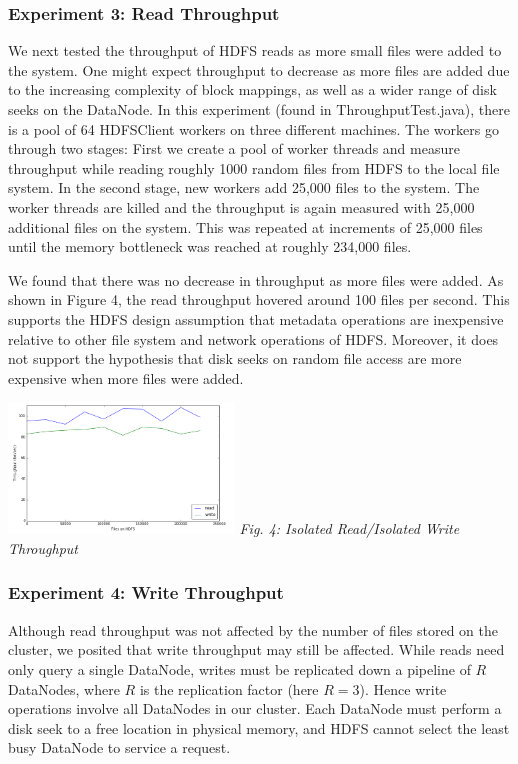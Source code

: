 \documentclass[11pt, a4paper]{article}
\begin{document}
\begin{multicols*}{2}
\subsubsection{Experiment 3: Read Throughput}\label{ReadThroughput}
We next tested the throughput of HDFS reads as more small files were added to the system. One might expect throughput to decrease as more files are added due to the increasing complexity of block mappings, as well as a wider range of disk seeks on the DataNode. In this experiment (found in ThroughputTest.java), there is a pool of 64 HDFSClient workers on three different machines. The workers go through two stages: First we create a pool of worker threads and measure throughput while reading roughly 1000 random files from HDFS to the local file system. In the second stage, new workers add 25,000 files to the system. The worker threads are killed and the throughput is again measured with 25,000 additional files on the system. This was repeated at increments of 25,000 files until the memory bottleneck was reached at roughly 234,000 files.

We found that there was no decrease in throughput as more files were added. As shown in Figure 4, the read throughput hovered around 100 files per second. This supports the HDFS design assumption that metadata operations are inexpensive relative to other file system and network operations of HDFS. Moreover, it does not support the hypothesis that disk seeks on random file access are more expensive when more files were added.

\begin{center}
	\includegraphics[keepaspectratio=true, width=0.45\textwidth]{ThroughputResults}	
	\textit{Fig. 4: Isolated Read/Isolated Write Throughput}
\end{center}
\subsubsection{Experiment 4: Write Throughput}\label{WriteThroughput}
Although read throughput was not affected by the number of files stored on the cluster, we posited that write throughput may still be affected. While reads need only query a single DataNode, writes must be replicated down a pipeline of $R$ DataNodes, where $R$ is the replication factor (here $R = 3$). Hence write operations involve  all DataNodes in our cluster. Each DataNode must perform a disk seek to a free location in physical memory, and HDFS cannot select the least busy DataNode to service a request.


\end{multicols*}
\end{document}
